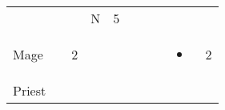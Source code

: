 \documentclass[12pt]{article}
\newcommand{\indexClass}[1]{\index{#1}}
\newcommand{\class}[1]{#1\indexClass{#1}}
\begin{document}
\begin{longtable}[]{@{}llllllllll@{}}
\begin{minipage}[t]{0.06\columnwidth}
\strut\end{minipage} &
\begin{minipage}[t]{0.06\columnwidth}\raggedright\strut
\strut\end{minipage} &
\begin{minipage}[t]{0.06\columnwidth}\raggedright\strut
\strut\end{minipage} &
\begin{minipage}[t]{0.07\columnwidth}\raggedright\strut
N
\strut\end{minipage} &
\begin{minipage}[t]{0.08\columnwidth}\raggedright\strut
5
\strut\end{minipage}\tabularnewline
\begin{minipage}[t]{0.13\columnwidth}\raggedright\strut
\class{Mage}
\strut\end{minipage} &
\begin{minipage}[t]{0.06\columnwidth}\raggedright\strut
\strut\end{minipage} &
\begin{minipage}[t]{0.06\columnwidth}\raggedright\strut
2
\strut\end{minipage} &
\begin{minipage}[t]{0.06\columnwidth}\raggedright\strut
\strut\end{minipage} &
\begin{minipage}[t]{0.06\columnwidth}\raggedright\strut
\strut\end{minipage} &
\begin{minipage}[t]{0.06\columnwidth}\raggedright\strut
\strut\end{minipage} &
\begin{minipage}[t]{0.06\columnwidth}\raggedright\strut
\strut\end{minipage} &
\begin{minipage}[t]{0.06\columnwidth}\raggedright\strut
\strut\end{minipage} &
\begin{minipage}[t]{0.07\columnwidth}\raggedright\strut
\begin{itemize}
\item
\end{itemize}
\strut\end{minipage} &
\begin{minipage}[t]{0.08\columnwidth}\raggedright\strut
2
\strut\end{minipage}\tabularnewline
\begin{minipage}[t]{0.13\columnwidth}\raggedright\strut
\class{Priest}

\end{minipage}
\end{longtable}
\end{document}
